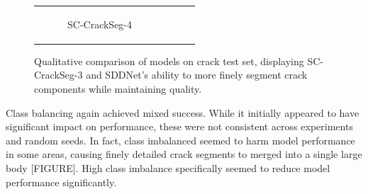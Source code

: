 \documentclass[a4paper,12pt]{report}
\begin{document}
\begin{figure}[htbp]
\begin{tabular}{cccc}
\begin{subfigure}[b]{0.23\textwidth}
            \caption{SC-CrackSeg-4}
            \label{fig:crackseg-experiment-qualitative-sc-crackseg-4}
        \end{subfigure}
    \end{tabular}
    \caption{Qualitative comparison of models on crack test set, displaying SC-CrackSeg-3 and SDDNet's ability to more finely segment crack components while maintaining quality.}
\end{figure}

Class balancing again achieved mixed success. While it initially appeared to have significant impact on performance, these were not consistent across experiments and random seeds. In fact, class imbalanced seemed to harm model performance in some areas, causing finely detailed crack segments to merged into a single large body [FIGURE]. High class imbalance specifically seemed to reduce model performance significantly.
\end{document}
